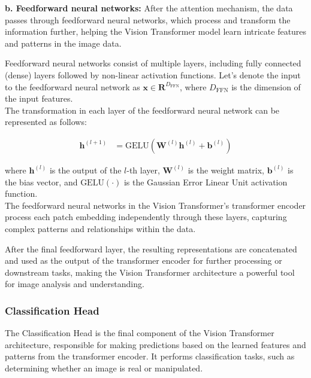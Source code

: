\noindent \textbf{b. Feedforward neural networks:} After the attention mechanism, the data passes through feedforward neural networks, which process and transform the information further, helping the Vision Transformer model learn intricate features and patterns in the image data.

\noindent Feedforward neural networks consist of multiple layers, including fully connected (dense) layers followed by non-linear activation functions. Let's denote the input to the feedforward neural network as $\mathbf{x} \in \mathbf{R}^{D_{\text{FFN}}}$, where $D_{\text{FFN}}$ is the dimension of the input features.
\\

\noindent The transformation in each layer of the feedforward neural network can be represented as follows:

\begin{align}
    \mathbf{h}^{(l+1)} & = \text{GELU}\left(\mathbf{W}^{(l)} \mathbf{h}^{(l)} + \mathbf{b}^{(l)}\right) \label{eq:feedforward}
\end{align}

\noindent where $\mathbf{h}^{(l)}$ is the output of the $l$-th layer, $\mathbf{W}^{(l)}$ is the weight matrix, $\mathbf{b}^{(l)}$ is the bias vector, and $\text{GELU}(\cdot)$ is the Gaussian Error Linear Unit activation function.
\\

\noindent The feedforward neural networks in the Vision Transformer's transformer encoder process each patch embedding independently through these layers, capturing complex patterns and relationships within the data.

\noindent After the final feedforward layer, the resulting representations are concatenated and used as the output of the transformer encoder for further processing or downstream tasks, making the Vision Transformer architecture a powerful tool for image analysis and understanding.


\subsubsection{Classification Head}
The Classification Head is the final component of the Vision Transformer architecture, responsible for making predictions based on the learned features and patterns from the transformer encoder. It performs classification tasks, such as determining whether an image is real or manipulated.
\\


